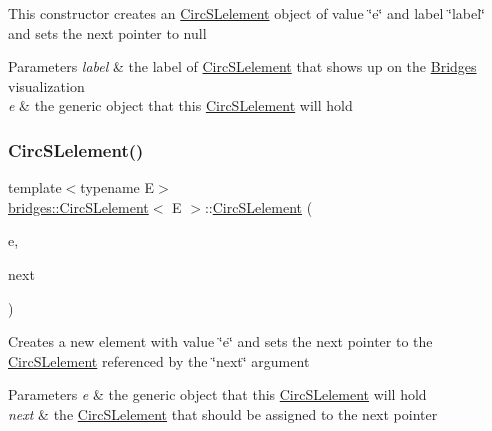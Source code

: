 This constructor creates an \hyperlink{classbridges_1_1_circ_s_lelement}{Circ\+S\+Lelement} object of value \char`\"{}e\char`\"{} and label \char`\"{}label\char`\"{} and sets the next pointer to null


\begin{DoxyParams}{Parameters}
{\em label} & the label of \hyperlink{classbridges_1_1_circ_s_lelement}{Circ\+S\+Lelement} that shows up on the \hyperlink{namespacebridges_1_1_bridges}{Bridges} visualization \\
\hline
{\em e} & the generic object that this \hyperlink{classbridges_1_1_circ_s_lelement}{Circ\+S\+Lelement} will hold \\
\hline
\end{DoxyParams}
\hypertarget{classbridges_1_1_circ_s_lelement_a6394498ffc6f2b2af65f500f8802ab0b}{}\label{classbridges_1_1_circ_s_lelement_a6394498ffc6f2b2af65f500f8802ab0b} 
\subsubsection{\texorpdfstring{Circ\+S\+Lelement()}{CircSLelement()}\hspace{0.1cm}{\footnotesize\ttfamily [3/4]}}
{\footnotesize\ttfamily template$<$typename E$>$ \\
\hyperlink{classbridges_1_1_circ_s_lelement}{bridges\+::\+Circ\+S\+Lelement}$<$ E $>$\+::\hyperlink{classbridges_1_1_circ_s_lelement}{Circ\+S\+Lelement} (\begin{DoxyParamCaption}\item[{E}]{e,  }\item[{\hyperlink{classbridges_1_1_circ_s_lelement}{Circ\+S\+Lelement}$<$ E $>$ $\ast$}]{next }\end{DoxyParamCaption})\hspace{0.3cm}{\ttfamily [inline]}}

Creates a new element with value \char`\"{}e\char`\"{} and sets the next pointer to the \hyperlink{classbridges_1_1_circ_s_lelement}{Circ\+S\+Lelement} referenced by the \char`\"{}next\char`\"{} argument


\begin{DoxyParams}{Parameters}
{\em e} & the generic object that this \hyperlink{classbridges_1_1_circ_s_lelement}{Circ\+S\+Lelement} will hold \\
\hline
{\em next} & the \hyperlink{classbridges_1_1_circ_s_lelement}{Circ\+S\+Lelement} that should be assigned to the next pointer \\
\hline
\end{DoxyParams}
\hypertarget{classbridges_1_1_circ_s_lelement_a1fda146fc0da1d8c7d6440cbbbb2ce42}{}\label{classbridges_1_1_circ_s_lelement_a1fda146fc0da1d8c7d6440cbbbb2ce42} 
